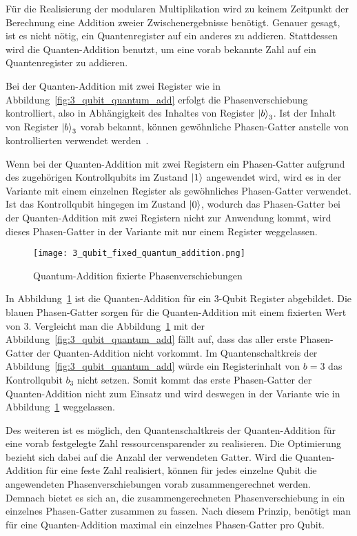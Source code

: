 Für die Realisierung der modularen Multiplikation wird zu keinem Zeitpunkt der Berechnung eine Addition zweier Zwischenergebnisse benötigt. 
Genauer gesagt, ist es nicht nötig, ein Quantenregister auf ein anderes zu addieren. 
Stattdessen wird die Quanten-Addition benutzt, um eine vorab bekannte Zahl auf ein Quantenregister zu addieren.

Bei der Quanten-Addition mit zwei Register wie in Abbildung~\ref{fig:3_qubit_quantum_add} erfolgt die Phasenverschiebung kontrolliert,  
also in Abhängigkeit des Inhaltes von Register \(\ket{b}_3\).
Ist der Inhalt von Register \(\ket{b}_3\) vorab bekannt,
können gewöhnliche Phasen-Gatter anstelle von kontrollierten verwendet werden~\cite{beauregard2003circuit}.

Wenn bei der Quanten-Addition mit zwei Registern ein Phasen-Gatter aufgrund des zugehörigen Kontrollqubits im Zustand \(\ket{1}\) angewendet wird,
wird es in der Variante mit einem einzelnen Register als gewöhnliches Phasen-Gatter verwendet.
Ist das Kontrollqubit hingegen im Zustand \(\ket{0}\), 
wodurch das Phasen-Gatter bei der Quanten-Addition mit zwei Registern nicht zur Anwendung kommt, 
wird dieses Phasen-Gatter in der Variante mit nur einem Register weggelassen.

\begin{figure}[H]
    \caption{Quantum-Addition fixierte Phasenverschiebungen}
    \label{fig:3_qubit_fixed_quantum_addition}
    \texttt{[image: 3\_qubit\_fixed\_quantum\_addition.png]}
    \centering
    \end{figure}
In Abbildung~\ref{fig:3_qubit_fixed_quantum_addition} ist die Quanten-Addition für ein 3-Qubit Register abgebildet.
Die blauen Phasen-Gatter sorgen für die Quanten-Addition mit einem fixierten Wert von \(3\).
Vergleicht man die Abbildung~\ref{fig:3_qubit_fixed_quantum_addition} mit der Abbildung~\ref{fig:3_qubit_quantum_add} fällt auf, 
dass das aller erste Phasen-Gatter der Quanten-Addition nicht vorkommt.
Im Quantenschaltkreis der Abbildung~\ref{fig:3_qubit_quantum_add} würde ein Registerinhalt von \(b = 3\) das Kontrollqubit \(b_3\) nicht setzen. 
Somit kommt das erste Phasen-Gatter der Quanten-Addition nicht zum Einsatz und 
wird deswegen in der Variante wie in Abbildung~\ref{fig:3_qubit_fixed_quantum_addition} weggelassen. 

Des weiteren ist es möglich, 
den Quantenschaltkreis der Quanten-Addition für eine vorab festgelegte Zahl ressourcensparender zu realisieren.
Die Optimierung bezieht sich dabei auf die Anzahl der verwendeten Gatter.
Wird die Quanten-Addition für eine feste Zahl realisiert, 
können für jedes einzelne Qubit die angewendeten Phasenverschiebungen vorab zusammengerechnet werden.
Demnach bietet es sich an, 
die zusammengerechneten Phasenverschiebung in ein einzelnes Phasen-Gatter zusammen zu fassen.
Nach diesem Prinzip, benötigt man für eine Quanten-Addition maximal ein einzelnes Phasen-Gatter pro Qubit.

